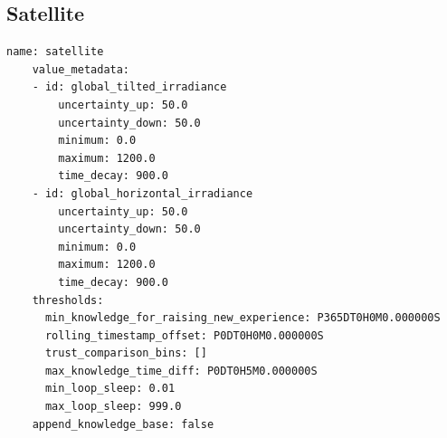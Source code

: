 \subsection{Satellite}

\begin{lstlisting}[style=yaml]
    name: satellite
    value_metadata:
    - id: global_tilted_irradiance
        uncertainty_up: 50.0
        uncertainty_down: 50.0
        minimum: 0.0
        maximum: 1200.0
        time_decay: 900.0
    - id: global_horizontal_irradiance
        uncertainty_up: 50.0
        uncertainty_down: 50.0
        minimum: 0.0
        maximum: 1200.0
        time_decay: 900.0
    thresholds:
      min_knowledge_for_raising_new_experience: P365DT0H0M0.000000S
      rolling_timestamp_offset: P0DT0H0M0.000000S
      trust_comparison_bins: []
      max_knowledge_time_diff: P0DT0H5M0.000000S
      min_loop_sleep: 0.01
      max_loop_sleep: 999.0
    append_knowledge_base: false
\end{lstlisting}